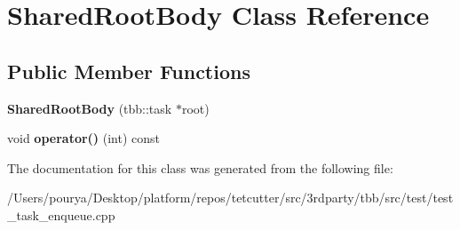 \hypertarget{classSharedRootBody}{}\section{Shared\+Root\+Body Class Reference}
\label{classSharedRootBody}
\subsection*{Public Member Functions}
\begin{DoxyCompactItemize}
\item 
\hypertarget{classSharedRootBody_a2e4c48a083ed1fdc922ae8dc3615ad31}{}{\bfseries Shared\+Root\+Body} (tbb\+::task $\ast$root)\label{classSharedRootBody_a2e4c48a083ed1fdc922ae8dc3615ad31}

\item 
\hypertarget{classSharedRootBody_a5240fb507ded5fd521733217adb8c483}{}void {\bfseries operator()} (int) const \label{classSharedRootBody_a5240fb507ded5fd521733217adb8c483}

\end{DoxyCompactItemize}


The documentation for this class was generated from the following file\+:\begin{DoxyCompactItemize}
\item 
/\+Users/pourya/\+Desktop/platform/repos/tetcutter/src/3rdparty/tbb/src/test/test\+\_\+task\+\_\+enqueue.\+cpp\end{DoxyCompactItemize}
